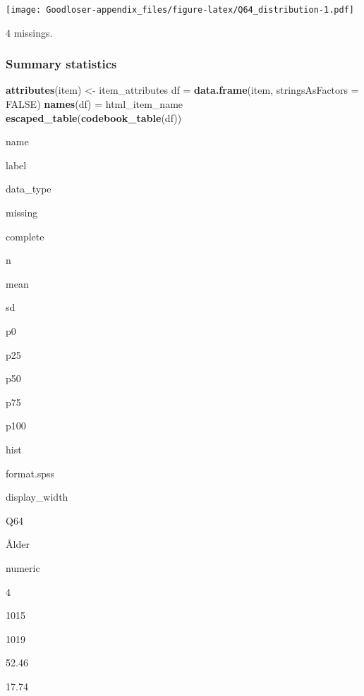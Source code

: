 \documentclass[]{book}
\newenvironment{Shaded}{\begin{snugshade}}{\end{snugshade}}
\newcommand{\KeywordTok}[1]{\textcolor[rgb]{0.13,0.29,0.53}{\textbf{#1}}}
\newcommand{\DataTypeTok}[1]{\textcolor[rgb]{0.13,0.29,0.53}{#1}}
\newcommand{\StringTok}[1]{\textcolor[rgb]{0.31,0.60,0.02}{#1}}
\newcommand{\OtherTok}[1]{\textcolor[rgb]{0.56,0.35,0.01}{#1}}
\newcommand{\OperatorTok}[1]{\textcolor[rgb]{0.81,0.36,0.00}{\textbf{#1}}}
\newcommand{\NormalTok}[1]{#1}
\begin{document}
\texttt{[image: Goodloser-appendix\_files/figure-latex/Q64\_distribution-1.pdf]}

\begin{Shaded}
\end{Shaded}

4 missings.

\subsubsection{Summary statistics}\label{Q64_summary}

\begin{Shaded}
\begin{Highlighting}[]
\KeywordTok{attributes}\NormalTok{(item) <-}\StringTok{ }\NormalTok{item_attributes}
\NormalTok{df =}\StringTok{ }\KeywordTok{data.frame}\NormalTok{(item, }\DataTypeTok{stringsAsFactors =} \OtherTok{FALSE}\NormalTok{)}
\KeywordTok{names}\NormalTok{(df) =}\StringTok{ }\NormalTok{html_item_name}
\KeywordTok{escaped_table}\NormalTok{(}\KeywordTok{codebook_table}\NormalTok{(df))}
\end{Highlighting}
\end{Shaded}

name

label

data\_type

missing

complete

n

mean

sd

p0

p25

p50

p75

p100

hist

format.spss

display\_width

Q64

Ålder

numeric

4

1015

1019

52.46

17.74
\end{document}

